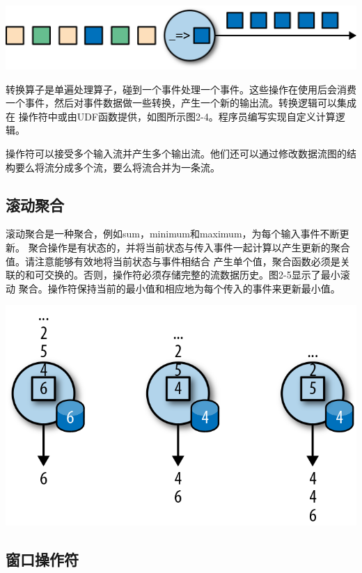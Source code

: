 \documentclass[cn,11pt,chinese]{elegantbook}
\begin{document}
\includegraphics{images/spaf_0204.png}

转换算子是单遍处理算子，碰到一个事件处理一个事件。这些操作在使用后会消费一个事件，然后对事件数据做一些转换，产生一个新的输出流。转换逻辑可以集成在
操作符中或由UDF函数提供，如图所示图2-4。程序员编写实现自定义计算逻辑。

操作符可以接受多个输入流并产生多个输出流。他们还可以通过修改数据流图的结构要么将流分成多个流，要么将流合并为一条流。

\hypertarget{ux6edaux52a8ux805aux5408}{%
\subsection{滚动聚合}\label{ux6edaux52a8ux805aux5408}}

滚动聚合是一种聚合，例如sum，minimum和maximum，为每个输入事件不断更新。
聚合操作是有状态的，并将当前状态与传入事件一起计算以产生更新的聚合值。请注意能够有效地将当前状态与事件相结合
产生单个值，聚合函数必须是关联的和可交换的。否则，操作符必须存储完整的流数据历史。图2-5显示了最小滚动
聚合。操作符保持当前的最小值和相应地为每个传入的事件来更新最小值。

\includegraphics{images/spaf_0205.png}

\hypertarget{ux7a97ux53e3ux64cdux4f5cux7b26}{%
\subsection{窗口操作符}\label{ux7a97ux53e3ux64cdux4f5cux7b26}}
\end{document}
